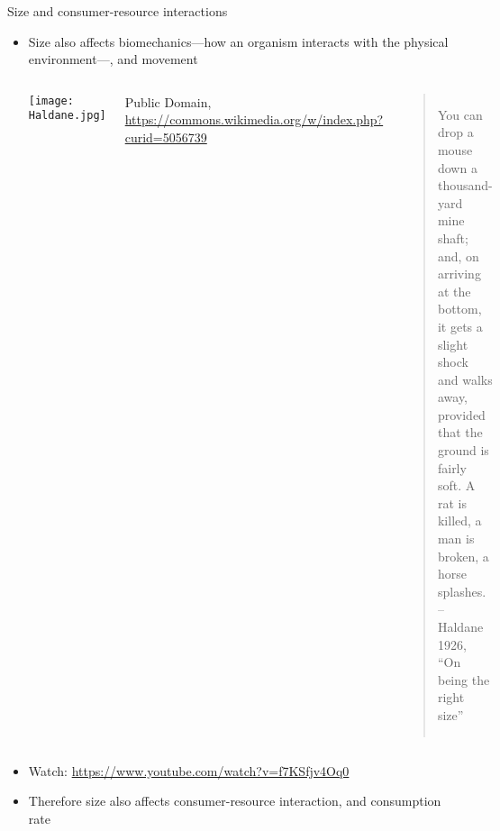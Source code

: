 \begin{frame}{Size and consumer-resource interactions}

  \begin{itemize}[<+->]\setlength{\itemindent}{0em}\itemsep4pt
      \item Size also affects biomechanics---how an organism interacts with the physical environment---, and movement 
      \vspace{2pt}
    \begin{columns}[c]
      \centering
        \vspace*{\fill} 
        \texttt{[image: Haldane.jpg]}\\
        {\tiny Public Domain, \url{https://commons.wikimedia.org/w/index.php?curid=5056739}\par} 
        \vspace*{\fill}
      \centering
      \vspace*{\fill} 
      \begin{quote} 
        You can drop a mouse down a thousand-yard mine shaft; and, on 
        arriving at the bottom, it gets a slight shock and walks away, 
        provided that the ground is fairly soft. A rat is killed, a man is 
        broken, a horse splashes. \\
        \centering
        \hfill -- {\small Haldane 1926, ``On being the right size''}
        \end{quote}
      \vspace*{\fill}
    \end{columns}
  
    \item Watch: \small \url{https://www.youtube.com/watch?v=f7KSfjv4Oq0} 

    \item Therefore size also affects consumer-resource interaction, and consumption rate
  
  \end{itemize}
  
  \end{frame}
